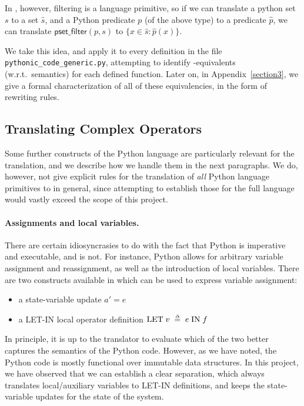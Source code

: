 In \tlap{}, however, filtering is a language primitive, so if we can translate a
python set $s$ to a \tlap{} set $\hat{s}$, and a Python predicate $p$ (of the
above type) to a \tlap{} predicate $\hat{p}$, we can translate
$\mathsf{pset\_filter}(p, s)$ to $\{ x \in \hat{s}\colon \hat{p}(x) \}$.

We take this idea, and apply it to every definition in the file
\texttt{pythonic\_code\_generic.py}, attempting to identify \tlap{}-equivalents
(w.r.t.\ semantics) for each defined function.  Later on, in
Appendix~\ref{section3}, we give a formal characterization of all of these
equivalencies, in the form of rewriting rules.

\subsection{Translating Complex Operators}

Some further constructs of the Python language are particularly
relevant for the translation, and we describe how we handle them in the next
paragraphs. We do, however, not give explicit rules for the translation of
\emph{all} Python language primitives to \tlap{} in general, since attempting to
establish those for the full language would vastly exceed the scope of this
project.

\paragraph{Assignments and local variables.} There are certain idiosyncrasies to
do with the fact that Python is imperative and executable, and \tlap{} is not.
For instance, Python allows for arbitrary variable assignment and reassignment,
as well as the introduction of local variables. There are two constructs
available in \tlap{} which can be used to express variable assignment:
\begin{itemize}
  \item a state-variable update $a' = e$
  \item a LET-IN local operator definition $\mathrm{LET}\; v \;\mathrel{\smash {{\stackrel{\scriptscriptstyle\Delta}{=}}}}\; e
    \;\mathrm{IN}\; f$
\end{itemize}

In principle, it is up to the translator to evaluate which of the two better
captures the semantics of the Python code. However, as we have noted, the Python
code is mostly functional over immutable data structures. In this project, we
have observed that we can establish a clear separation, which always translates
local/auxiliary variables to LET-IN definitions, and keeps the state-variable
updates for the state of the system.

